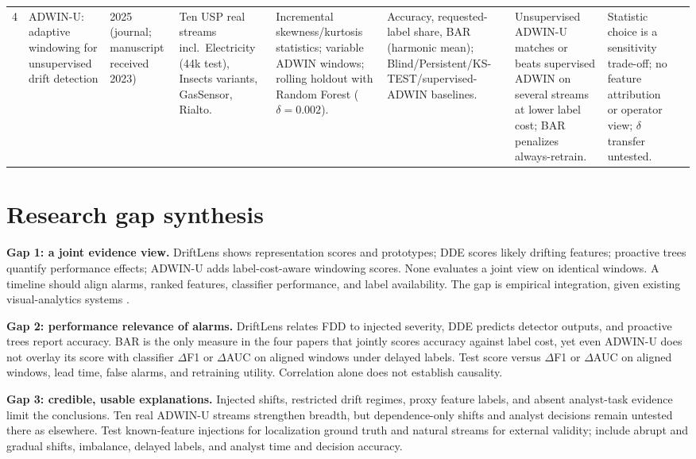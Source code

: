 \documentclass[10pt,a4paper]{article}
\begin{document}
\begin{landscape}
\begin{longtable}{L{0.45cm}L{3.05cm}L{1.15cm}L{2.95cm}L{3.05cm}L{2.95cm}L{2.95cm}L{3.0cm}L{3.95cm}}
4 & ADWIN-U: adaptive windowing for unsupervised drift detection & 2025 (journal; manuscript received 2023) & Ten USP real streams incl.\ Electricity (44k test), Insects variants, GasSensor, Rialto. & Incremental skewness/kurtosis statistics; variable ADWIN windows; rolling holdout with Random Forest ($\delta=0.002$). & Accuracy, requested-label share, BAR (harmonic mean); Blind/Persistent/KS-TEST/supervised-ADWIN baselines. & Unsupervised ADWIN-U matches or beats supervised ADWIN on several streams at lower label cost; BAR penalizes always-retrain. & Statistic choice is a sensitivity trade-off; no feature attribution or operator view; $\delta$ transfer untested.\\[5pt]
\end{longtable}
\end{landscape}

\section*{Research gap synthesis}
\textbf{Gap 1: a joint evidence view.} DriftLens shows representation scores and prototypes; DDE scores likely drifting features; proactive trees quantify performance effects; ADWIN-U adds label-cost-aware windowing scores. None evaluates a joint view on identical windows. A timeline should align alarms, ranked features, classifier performance, and label availability. The gap is empirical integration, given existing visual-analytics systems \cite{driftvis,conceptexplorer}.

\textbf{Gap 2: performance relevance of alarms.} DriftLens relates FDD to injected severity, DDE predicts detector outputs, and proactive trees report accuracy. BAR is the only measure in the four papers that jointly scores accuracy against label cost, yet even ADWIN-U does not overlay its score with classifier $\Delta$F1 or $\Delta$AUC on aligned windows under delayed labels. Test score versus $\Delta$F1 or $\Delta$AUC on aligned windows, lead time, false alarms, and retraining utility. Correlation alone does not establish causality.

\textbf{Gap 3: credible, usable explanations.} Injected shifts, restricted drift regimes, proxy feature labels, and absent analyst-task evidence limit the conclusions. Ten real ADWIN-U streams strengthen breadth, but dependence-only shifts and analyst decisions remain untested there as elsewhere. Test known-feature injections for localization ground truth and natural streams for external validity; include abrupt and gradual shifts, imbalance, delayed labels, and analyst time and decision accuracy.
\end{document}
